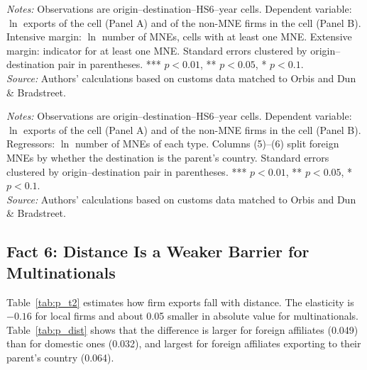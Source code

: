 \documentclass[11pt,a4paper]{article}
\begin{document}
\begin{table}[H]\centering\small%
  \caption{Multinational Presence and Exports}%
  \label{tab:p_t1}%
  \par\vspace{3pt}%
  \begin{minipage}{0.95\textwidth}\footnotesize %
  \textit{Notes:} Observations are origin--destination--HS6--year cells. Dependent variable: $\ln$ exports of the cell (Panel A) and of the non-MNE firms in the cell (Panel B). Intensive margin: $\ln$ number of MNEs, cells with at least one MNE. Extensive margin: indicator for at least one MNE. Standard errors clustered by origin--destination pair in parentheses. *** $p<0.01$, ** $p<0.05$, * $p<0.1$.\\[3pt]%
  \textit{Source:} Authors' calculations based on customs data matched to Orbis and Dun \& Bradstreet.%
  \end{minipage}%
  \end{table}
\begin{table}[H]\centering\small%
  \caption{Multinational Presence and Exports: Intensive Margin, by Type of Multinational}%
  \label{tab:p_f5counts}%
  \par\vspace{3pt}%
  \begin{minipage}{0.95\textwidth}\footnotesize %
  \textit{Notes:} Observations are origin--destination--HS6--year cells. Dependent variable: $\ln$ exports of the cell (Panel A) and of the non-MNE firms in the cell (Panel B). Regressors: $\ln$ number of MNEs of each type. Columns (5)--(6) split foreign MNEs by whether the destination is the parent's country. Standard errors clustered by origin--destination pair in parentheses. *** $p<0.01$, ** $p<0.05$, * $p<0.1$.\\[3pt]%
  \textit{Source:} Authors' calculations based on customs data matched to Orbis and Dun \& Bradstreet.%
  \end{minipage}%
  \end{table}

\subsection{Fact 6: Distance Is a Weaker Barrier for Multinationals}
Table~\ref{tab:p_t2} estimates how firm exports fall with distance. The elasticity is $-0.16$ for
local firms and about 0.05 smaller in absolute value for multinationals. Table~\ref{tab:p_dist}
shows that the difference is larger for foreign affiliates (0.049) than for domestic ones (0.032),
and largest for foreign affiliates exporting to their parent's country (0.064).
\end{document}
